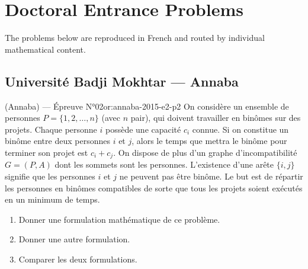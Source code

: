 \chapter{Doctoral Entrance Problems}
\label{ch:problems}

The problems below are reproduced in French and routed by individual mathematical content.
\newpage

\section{Université Badji Mokhtar --- Annaba}
\begin{problem}{(Annaba) — Épreuve N°02}{or:annaba-2015-e2-p2}
On considère un ensemble de personnes $P=\{1,2,\ldots,n\}$ (avec $n$ pair), qui doivent travailler en binômes sur des projets. Chaque personne $i$ possède une capacité $c_i$ connue. Si on constitue un binôme entre deux personnes $i$ et $j$, alors le temps que mettra le binôme pour terminer son projet est $c_i+c_j$. On dispose de plus d'un graphe d'incompatibilité $G=(P,A)$ dont les sommets sont les personnes. L'existence d'une arête $\{i,j\}$ signifie que les personnes $i$ et $j$ ne peuvent pas être binôme. Le but est de répartir les personnes en binômes compatibles de sorte que tous les projets soient exécutés en un minimum de temps.
\begin{enumerate}\item Donner une formulation mathématique de ce problème.\item Donner une autre formulation.\item Comparer les deux formulations.\end{enumerate}
\end{problem}
\newpage
